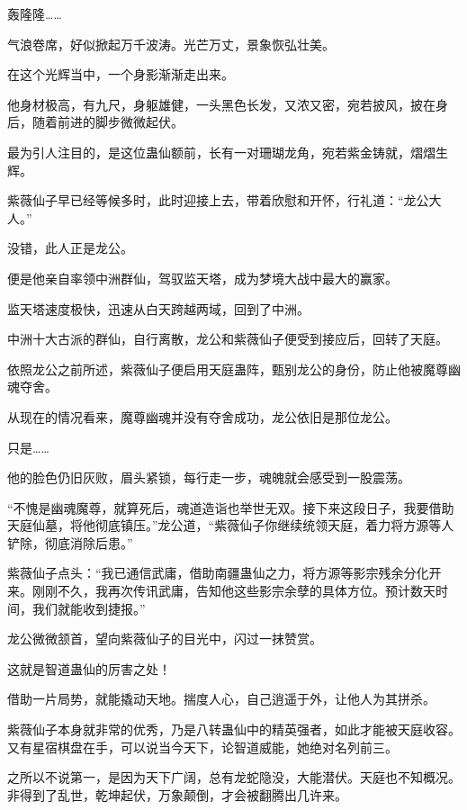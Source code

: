 
\begin{this_body}

轰隆隆……

气浪卷席，好似掀起万千波涛。光芒万丈，景象恢弘壮美。

在这个光辉当中，一个身影渐渐走出来。

他身材极高，有九尺，身躯雄健，一头黑色长发，又浓又密，宛若披风，披在身后，随着前进的脚步微微起伏。

最为引人注目的，是这位蛊仙额前，长有一对珊瑚龙角，宛若紫金铸就，熠熠生辉。

紫薇仙子早已经等候多时，此时迎接上去，带着欣慰和开怀，行礼道：“龙公大人。”

没错，此人正是龙公。

便是他亲自率领中洲群仙，驾驭监天塔，成为梦境大战中最大的赢家。

监天塔速度极快，迅速从白天跨越两域，回到了中洲。

中洲十大古派的群仙，自行离散，龙公和紫薇仙子便受到接应后，回转了天庭。

依照龙公之前所述，紫薇仙子便启用天庭蛊阵，甄别龙公的身份，防止他被魔尊幽魂夺舍。

从现在的情况看来，魔尊幽魂并没有夺舍成功，龙公依旧是那位龙公。

只是……

他的脸色仍旧灰败，眉头紧锁，每行走一步，魂魄就会感受到一股震荡。

“不愧是幽魂魔尊，就算死后，魂道造诣也举世无双。接下来这段日子，我要借助天庭仙墓，将他彻底镇压。”龙公道，“紫薇仙子你继续统领天庭，着力将方源等人铲除，彻底消除后患。”

紫薇仙子点头：“我已通信武庸，借助南疆蛊仙之力，将方源等影宗残余分化开来。刚刚不久，我再次传讯武庸，告知他这些影宗余孽的具体方位。预计数天时间，我们就能收到捷报。”

龙公微微颔首，望向紫薇仙子的目光中，闪过一抹赞赏。

这就是智道蛊仙的厉害之处！

借助一片局势，就能撬动天地。揣度人心，自己逍遥于外，让他人为其拼杀。

紫薇仙子本身就非常的优秀，乃是八转蛊仙中的精英强者，如此才能被天庭收容。又有星宿棋盘在手，可以说当今天下，论智道威能，她绝对名列前三。

之所以不说第一，是因为天下广阔，总有龙蛇隐没，大能潜伏。天庭也不知概况。非得到了乱世，乾坤起伏，万象颠倒，才会被翻腾出几许来。


\end{this_body}
